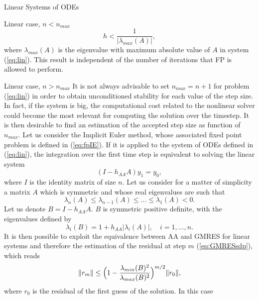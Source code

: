 \documentclass{article}
\begin{document}
\begin{section}{Linear Systems of ODEs}
\begin{subsection}{Linear case, $n < n_{max}$}
\begin{equation*}
	h < \frac{1}{|\lambda_{max}(A)|},
\end{equation*}
where $\lambda_{max}(A)$ is the eigenvalue with maximum absolute value of $A$ in system (\ref{eq:lin}). This result is independent of the number of iterations that FP is allowed to perform. 
\end{subsection}

\begin{subsection}{Linear case, $n > n_{max}$}
It is not always advisable to set $n_{max} = n+1$ for problem (\ref{eq:lin}) in order to obtain unconditioned stability for each value of the step size. In fact, if the system is big, the computational cost related to the nonlinear solver could become the most relevant for computing the solution over the timestep. It is then desirable to find an estimation of the accepted step size as function of $n_{max}$. Let us consider the Implicit Euler method, whose associated fixed point problem is defined in (\ref{eq:fpIE}). If it is applied to the system of ODEs defined in (\ref{eq:lin}), the integration over the first time step is equivalent to solving the linear system
\begin{equation*}
	(I - h_{AA}A)y_{1} = y_{0},
\end{equation*}
where $I$ is the identity matrix of size $n$. Let us consider for a matter of simplicity a matrix $A$ which is symmetric and whose real eigenvalues are such that
\begin{equation*}
	\lambda_n(A) \leq \lambda_{n-1}(A) \leq \dots \leq \lambda_1(A) < 0.
\end{equation*}
Let us denote $B = I - h_{AA}A$. $B$ is symmetric positive definite, with the eigenvalues defined by
\begin{equation*}
	\lambda_i(B) = 1 + h_{AA}|\lambda_i(A)|, \quad i = 1,\dots,n.
\end{equation*}
It is then possible to exploit the equivalence between AA and GMRES for linear systems and therefore the estimation of the residual at step $m$ (\ref{eq:GMRESsdp}), which reads 
\begin{equation}\label{eq:GMRESsdpagain}
	\|r_m\| \leq \Big{(} 1 - \frac{\lambda_{min}(B)^2}{\lambda_{max}(B)^2} \Big{)}^{m/2}\|r_0\|,
\end{equation}
where $r_0$ is the residual of the first guess of the solution. In this case

\end{subsection}
\end{section}
\end{document}
